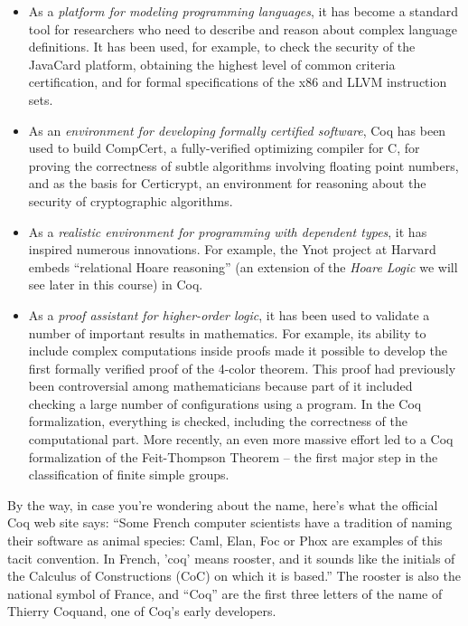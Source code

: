 \documentclass[12pt]{report}
\begin{document}
\begin{itemize}
\item  As a \textit{platform for modeling programming languages}, it has become
      a standard tool for researchers who need to describe and reason
      about complex language definitions.  It has been used, for
      example, to check the security of the JavaCard platform,
      obtaining the highest level of common criteria certification,
      and for formal specifications of the x86 and LLVM instruction
      sets.



\item  As an \textit{environment for developing formally certified software},
      Coq has been used to build CompCert, a fully-verified optimizing
      compiler for C, for proving the correctness of subtle algorithms
      involving floating point numbers, and as the basis for
      Certicrypt, an environment for reasoning about the security of
      cryptographic algorithms.



\item  As a \textit{realistic environment for programming with dependent
      types}, it has inspired numerous innovations.  For example, the
      Ynot project at Harvard embeds ``relational Hoare reasoning'' (an
      extension of the \textit{Hoare Logic} we will see later in this course)
      in Coq.



\item  As a \textit{proof assistant for higher-order logic}, it has been used
      to validate a number of important results in mathematics.  For
      example, its ability to include complex computations inside
      proofs made it possible to develop the first formally verified
      proof of the 4-color theorem.  This proof had previously been
      controversial among mathematicians because part of it included
      checking a large number of configurations using a program. In
      the Coq formalization, everything is checked, including the
      correctness of the computational part.  More recently, an even
      more massive effort led to a Coq formalization of the
      Feit-Thompson Theorem -- the first major step in the
      classification of finite simple groups.

\end{itemize}


   By the way, in case you're wondering about the name, here's what
   the official Coq web site says: ``Some French computer scientists
   have a tradition of naming their software as animal species: Caml,
   Elan, Foc or Phox are examples of this tacit convention. In French,
   'coq' means rooster, and it sounds like the initials of the
   Calculus of Constructions (CoC) on which it is based.''  The rooster
   is also the national symbol of France, and ``Coq'' are the first
   three letters of the name of Thierry Coquand, one of Coq's early
   developers. 
\end{document}
